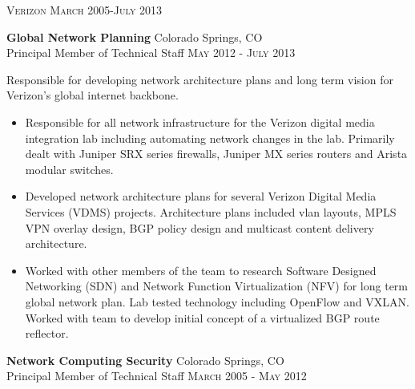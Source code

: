 
\textsc{Verizon} \hfill \textsc{March 2005-July 2013}

\textbf{Global Network Planning} \hfill Colorado Springs, CO\\
Principal Member of Technical Staff \hfill \textsc{May 2012} - \textsc{July 2013}

Responsible for developing network architecture plans and long term
vision for Verizon’s global internet backbone.

\begin{itemize}
\item
Responsible for all network infrastructure for the Verizon digital media
integration lab including automating network changes in the lab.  Primarily
dealt with Juniper SRX series firewalls, Juniper MX series routers and
Arista modular switches.

\item
Developed network architecture plans for several Verizon Digital Media Services
(VDMS) projects.  Architecture plans included vlan layouts, MPLS VPN overlay
design, BGP policy design and multicast content delivery architecture.

\item
Worked with other members of the team to research Software Designed Networking
(SDN) and Network Function Virtualization (NFV) for long term global network
plan.  Lab tested technology including OpenFlow and VXLAN.  Worked with team
to develop initial concept of a virtualized BGP route reflector.
\end{itemize}

\textbf{Network Computing Security} \hfill Colorado Springs, CO\\
Principal Member of Technical Staff \hfill \textsc{March 2005} - \textsc{May 2012}

